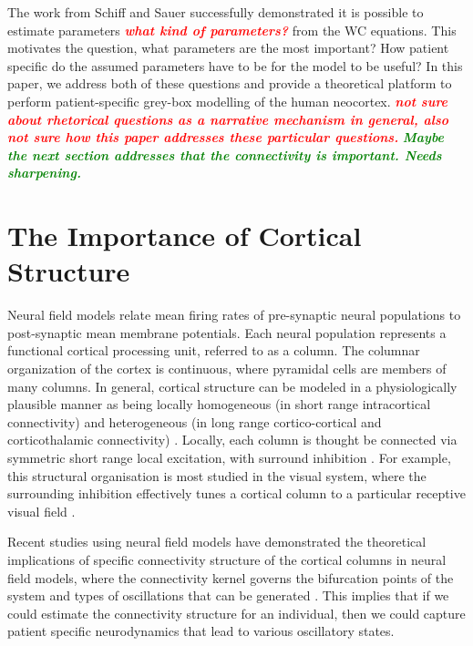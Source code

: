 \documentclass[12pt]{iopart}		%
\newcommand{\wtf}[1]{\textsf{\emph{\textbf{\textcolor{red}{#1}}}}}
\newcommand{\omg}[1]{\textsf{\emph{\textbf{\textcolor{green}{#1}}}}}
\begin{document}
The work from Schiff and Sauer \cite{schiff2008kalman} successfully demonstrated  it is possible to estimate parameters \wtf{what kind of parameters?} from the WC equations. This motivates the question, what parameters are the most important? How patient specific do the assumed parameters have to be for the model to be useful? In this paper, we address both of these questions and provide a theoretical platform to perform patient-specific grey-box modelling of the human neocortex. \wtf{not sure about rhetorical questions as a narrative mechanism in general, also not sure how this paper addresses these particular questions.} \omg{Maybe the next section addresses that the connectivity is important. Needs sharpening.}

\section{The Importance of Cortical Structure}
Neural field models relate mean firing rates of pre-synaptic neural populations to post-synaptic mean membrane potentials. Each neural population represents a functional cortical processing unit, referred to as a column. The columnar organization of the cortex is continuous, where pyramidal cells are members of many columns. In general, cortical structure can be modeled in a physiologically plausible manner as being locally homogeneous (in short range intracortical connectivity) and heterogeneous (in long range cortico-cortical and corticothalamic connectivity) \cite{Jirsa2009} \cite{Qubbaj2007}. Locally, each column is thought be connected via symmetric short range local excitation, with surround inhibition \cite{Braitenberg1998}. For example, this structural organisation is most studied in the visual system, where the surrounding inhibition effectively tunes a cortical column to a particular receptive visual field \cite{Sullivan2006}.

Recent studies using neural field models have demonstrated the theoretical implications of specific connectivity structure of the cortical columns in neural field models, where the connectivity kernel governs the bifurcation points of the system \cite{Hutt2005} and types of oscillations that can be generated \cite{Schmidt2009}. This implies that if we could estimate the connectivity structure for an individual, then we could capture patient specific neurodynamics that lead to various oscillatory states. 
\end{document}
